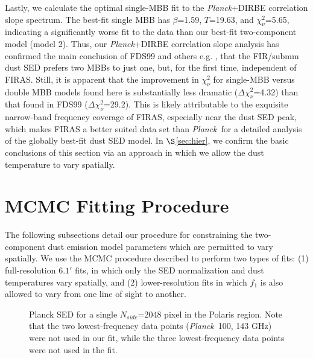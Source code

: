 \documentclass{emulateapj}
\newcommand{\PLANCK}{{\it Planck}}
\begin{document}
Lastly, we calculate the optimal single-MBB fit to the \PLANCK+DIRBE 
correlation slope spectrum. The best-fit single MBB has $\beta$=1.59, 
$T$=19.63, and $\chi^2_{\nu}$=5.65, indicating a significantly worse fit to the
data than our best-fit two-component model (model 2). Thus, our \PLANCK+DIRBE 
correlation slope analysis has confirmed the main conclusion of FDS99 and 
others e.g. \cite{reach95}, that the FIR/submm dust SED prefers two MBBs to 
just one, but, for the first time, independent of FIRAS. Still, it is apparent 
that the improvement in $\chi^2_{\nu}$ for single-MBB versus double MBB models 
found here is substantially less dramatic ($\Delta\chi^2_{\nu}$=4.32) than that
found in FDS99 ($\Delta\chi^2_{\nu}$=29.2). This is likely attributable to the 
exquisite narrow-band frequency coverage of FIRAS, especially near the dust SED
peak, which makes FIRAS a better suited data set than \PLANCK~for a detailed 
analysis of the globally best-fit dust SED model. In $\S$\ref{sec:hier}, we
confirm the basic conclusions of this section via an approach in which we 
allow the dust temperature to vary spatially.



\section{MCMC Fitting Procedure}
\label{sec:fitting}

The following subsections detail our procedure for constraining the 
two-component dust emission model parameters which are permitted to vary
spatially. We use the MCMC procedure described to perform two types of fits: 
(1) full-resolution $6.1'$ fits, in which only  the SED normalization and dust 
temperatures vary spatially, and (2) lower-resolution fits in which $f_1$ is 
also allowed to vary from one line of sight to another.

\begin{figure}
\begin{center}
\caption{\label{fig:sed} Planck SED for a single $N_{side}$=2048 pixel in the 
Polaris region. Note that the two lowest-frequency data points (\PLANCK~100, 
143 GHz) were not used in our fit, while the three lowest-frequency data
points were not used in the \cite{planckdust} fit.}
\end{center}
\end{figure}
\end{document}
